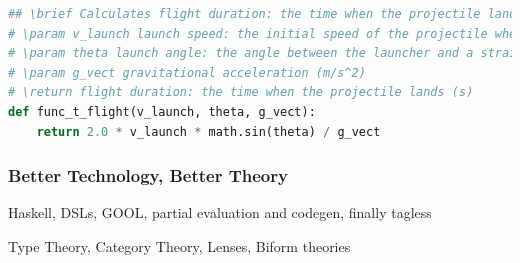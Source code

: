 \documentclass[usenames,dvipsnames,10pt]{beamer}
\begin{document}
\begin{frame}[fragile]
\begin{lstlisting}[language=Python,basicstyle=\ttfamily\tiny,
  keywordstyle=bfseries,breaklines=false]
## \brief Calculates flight duration: the time when the projectile lands (s)
# \param v_launch launch speed: the initial speed of the projectile when launched (m/s)
# \param theta launch angle: the angle between the launcher and a straight line from the launcher to the target (rad)
# \param g_vect gravitational acceleration (m/s^2)
# \return flight duration: the time when the projectile lands (s)
def func_t_flight(v_launch, theta, g_vect):
    return 2.0 * v_launch * math.sin(theta) / g_vect

\end{lstlisting}
\end{frame}
  
\begin{frame}
  
  \frametitle{Better Technology, Better Theory}
Haskell, DSLs, GOOL, partial evaluation and codegen, finally tagless

Type Theory, Category Theory, Lenses, Biform theories

\end{frame}
  
\end{document}
